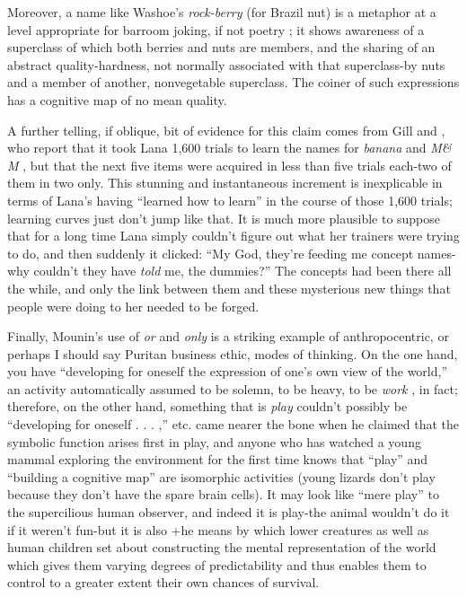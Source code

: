 
Moreover, a name like Washoe's \textit{rock-berry} (for Brazil nut) is a meta\-phor at a level appropriate for barroom joking, if not poetry ; it shows awareness of a superclass of which both berries and nuts are members, and the sharing of an abstract quality-hardness, not normally asso\-ciated with that superclass-by nuts and a member of another, non\-vegetable superclass. The coiner of such expressions has a cognitive map of no mean quality.

A further telling, if oblique, bit of evidence for this claim comes
from Gill and \citet{Rumbaugh1974}, who report that it took Lana 1,600 trials to learn the names for \textit{banana} and \textit{M\& M} , but that the next five items were acquired in less than five trials each-two of them in two only. This stunning and instantaneous increment is inexplicable in terms of Lana's having ``learned how to learn'' in the course of those 1,600 trials; learning curves just don't jump like that. It is much more plausible to suppose that for a long time Lana simply couldn't figure out what her trainers were trying to do, and then suddenly it clicked: ``My God, they're feeding me concept names-why couldn't they have \textit{told} me, the dummies?'' The concepts had been there all the while, and only the link between them and these mysterious new things that people were doing to her needed to be forged.

Finally, Mounin's use of \textit{or} and \textit{only} is a striking example of anthropocentric, or perhaps I should say Puritan business ethic, modes of thinking. On the one hand, you have ``developing for oneself the expression of one's own view of the world,'' an activity automatically assumed to be solemn, to be heavy, to be \textit{work} , in fact; therefore, on the other hand, something that is \textit{play} couldn't possibly be ``de\-veloping for oneself . . . ,'' etc. \citet{Piaget1962} came nearer the bone when he claimed that the symbolic function arises first in play, and anyone who has watched a young mammal exploring the environment for the first time knows that ``play'' and ``building a cognitive map'' are isomorphic activities (young lizards don't play because they don't have the spare brain cells). It may look like ``mere play'' to the super\-cilious human observer, and indeed it is play-the animal wouldn't do it if it weren't fun-but it is also +he means by which lower creatures
as well as human children set about constructing the mental representa\-tion of the world which gives them varying degrees of predictability
and thus enables them to control to a greater extent their own chances of survival.

